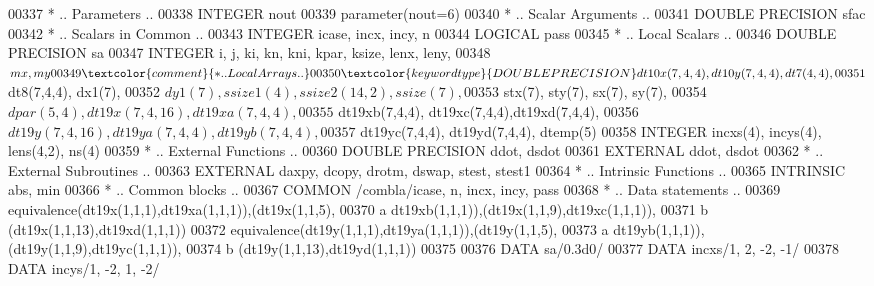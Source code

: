 \begin{DoxyCode}
00337 \textcolor{comment}{*     .. Parameters ..}
00338       \textcolor{keywordtype}{INTEGER}           nout
00339       parameter(nout=6)
00340 \textcolor{comment}{*     .. Scalar Arguments ..}
00341       \textcolor{keywordtype}{DOUBLE PRECISION}  sfac
00342 \textcolor{comment}{*     .. Scalars in Common ..}
00343       \textcolor{keywordtype}{INTEGER}           icase, incx, incy, n
00344       \textcolor{keywordtype}{LOGICAL}           pass
00345 \textcolor{comment}{*     .. Local Scalars ..}
00346       \textcolor{keywordtype}{DOUBLE PRECISION}  sa
00347       \textcolor{keywordtype}{INTEGER}           i, j, ki, kn, kni, kpar, ksize, lenx, leny,
00348      $                  mx, my 
00349 \textcolor{comment}{*     .. Local Arrays ..}
00350       \textcolor{keywordtype}{DOUBLE PRECISION}  dt10x(7,4,4), dt10y(7,4,4), dt7(4,4),
00351      $                  dt8(7,4,4), dx1(7),
00352      $                  dy1(7), ssize1(4), ssize2(14,2), ssize(7),
00353      $                  stx(7), sty(7), sx(7), sy(7),
00354      $                  dpar(5,4), dt19x(7,4,16),dt19xa(7,4,4),
00355      $                  dt19xb(7,4,4), dt19xc(7,4,4),dt19xd(7,4,4),
00356      $                  dt19y(7,4,16), dt19ya(7,4,4),dt19yb(7,4,4),
00357      $                  dt19yc(7,4,4), dt19yd(7,4,4), dtemp(5)
00358       \textcolor{keywordtype}{INTEGER}           incxs(4), incys(4), lens(4,2), ns(4)
00359 \textcolor{comment}{*     .. External Functions ..}
00360       \textcolor{keywordtype}{DOUBLE PRECISION}  ddot, dsdot
00361       \textcolor{keywordtype}{EXTERNAL}          ddot, dsdot
00362 \textcolor{comment}{*     .. External Subroutines ..}
00363       \textcolor{keywordtype}{EXTERNAL}          daxpy, dcopy, drotm, dswap, stest, stest1
00364 \textcolor{comment}{*     .. Intrinsic Functions ..}
00365       \textcolor{keywordtype}{INTRINSIC}         abs, min
00366 \textcolor{comment}{*     .. Common blocks ..}
00367       \textcolor{keyword}{COMMON}            /combla/icase, n, incx, incy, pass
00368 \textcolor{comment}{*     .. Data statements ..}
00369       equivalence(dt19x(1,1,1),dt19xa(1,1,1)),(dt19x(1,1,5),
00370      a   dt19xb(1,1,1)),(dt19x(1,1,9),dt19xc(1,1,1)),
00371      b   (dt19x(1,1,13),dt19xd(1,1,1))
00372       equivalence(dt19y(1,1,1),dt19ya(1,1,1)),(dt19y(1,1,5),
00373      a   dt19yb(1,1,1)),(dt19y(1,1,9),dt19yc(1,1,1)),
00374      b   (dt19y(1,1,13),dt19yd(1,1,1))
00375 
00376       \textcolor{keyword}{DATA}              sa/0.3d0/
00377       \textcolor{keyword}{DATA}              incxs/1, 2, -2, -1/
00378       \textcolor{keyword}{DATA}              incys/1, -2, 1, -2/

\end{DoxyCode}
